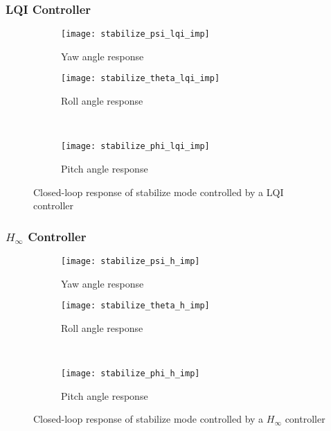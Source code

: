 \subsubsection{LQI Controller}

\begin{figure}[H]
\begin{subfigure}{.5\linewidth}
\centering
\texttt{[image: stabilize\_psi\_lqi\_imp]}
\caption{Yaw angle response}
\label{fig:stabilize_psi_lqi_imp}
\end{subfigure}%
\begin{subfigure}{.5\linewidth}
\centering
\texttt{[image: stabilize\_theta\_lqi\_imp]}
\caption{Roll angle response}
\label{fig:stabilize_theta_lqi_imp}
\end{subfigure}\\[1ex]
\begin{subfigure}{\linewidth}
\centering
\texttt{[image: stabilize\_phi\_lqi\_imp]}
\caption{Pitch angle response}
\label{fig:stabilize_psi_lqi_imp}
\end{subfigure}
\caption{Closed-loop response of stabilize mode controlled by a LQI controller}
\label{fig:stabilize_lqi_imp}
\end{figure}


\subsubsection{$H_\infty$ Controller}

\begin{figure}[H]
\begin{subfigure}{.5\linewidth}
\centering
\texttt{[image: stabilize\_psi\_h\_imp]}
\caption{Yaw angle response}
\label{fig:stabilize_psi_h_imp}
\end{subfigure}%
\begin{subfigure}{.5\linewidth}
\centering
\texttt{[image: stabilize\_theta\_h\_imp]}
\caption{Roll angle response}
\label{fig:stabilize_theta_h_imp}
\end{subfigure}\\[1ex]
\begin{subfigure}{\linewidth}
\centering
\texttt{[image: stabilize\_phi\_h\_imp]}
\caption{Pitch angle response}
\label{fig:stabilize_psi_h_imp}
\end{subfigure}
\caption{Closed-loop response of stabilize mode controlled by a $H_\infty$ controller}
\label{fig:stabilize_h_imp}
\end{figure}


